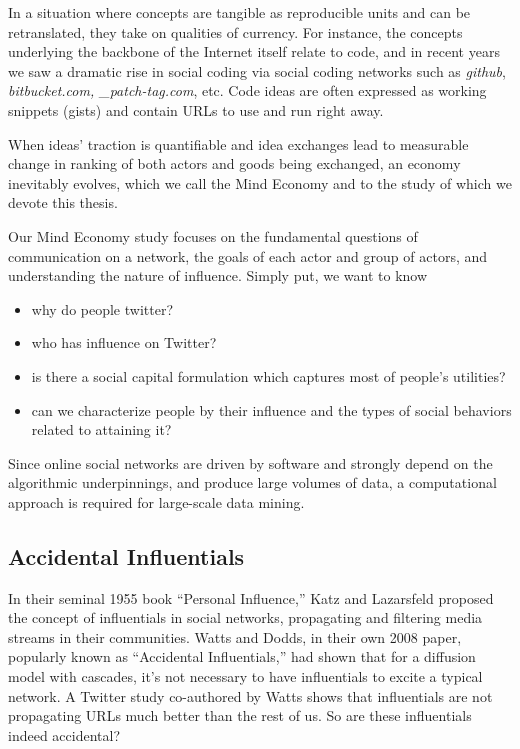 \documentclass[10pt,oneside]{memoir}
\begin{document}
In a situation where concepts are tangible as reproducible units and can be retranslated, they take on qualities of currency.  For instance, the concepts underlying the backbone of the Internet itself relate to code, and in recent years we saw a dramatic rise in social coding via social coding networks such as {\itshape github}, {\itshape bitbucket.com, \_patch-tag.com}, etc.  Code ideas are often expressed as working snippets (gists) and contain URLs to use and run right away.


When ideas' traction is quantifiable and idea exchanges lead to measurable change in ranking of both actors and goods being exchanged, an economy inevitably evolves, which we call the Mind Economy and to the study of which we devote this thesis.


Our Mind Economy study focuses on the fundamental questions of communication on a network, the goals of each actor and group of actors, and understanding the nature of influence.  Simply put, we want to know


\begin{itemize}


\item why do people twitter?

\item who has influence on Twitter? 

\item is there a social capital formulation which captures most of people's utilities?

\item can we characterize people by their influence and the types of social behaviors related to attaining it?
\end{itemize}

Since online social networks are driven by software and strongly depend on the algorithmic underpinnings, and produce large volumes of data, a computational approach is required for large-scale data mining.


\pagebreak \subsection{Accidental Influentials}
\label{accidentalinfluentials}

In their seminal 1955 book ``Personal Influence,'' Katz and Lazarsfeld \cite{katz1955influence} proposed the concept of influentials in social networks, propagating and filtering media streams in their communities.  Watts and Dodds, in their own 2008 paper, popularly known as ``Accidental Influentials,'' had shown that for a diffusion model with cascades, it's not necessary to have influentials to excite a typical network.  A Twitter study co-authored by Watts shows that influentials are not propagating URLs much better than the rest of us.  So are these influentials indeed accidental?
\end{document}
